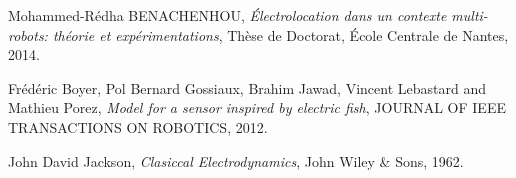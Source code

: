 \documentclass[11pt,a4paper,french]{article}
\begin{document}
\begin{thebibliography}{99}
 Mohammed-Rédha BENACHENHOU, \emph{Électrolocation dans un contexte multi-robots: théorie et expérimentations}, Thèse de Doctorat, École Centrale de Nantes, 2014. 

 Frédéric Boyer, Pol Bernard Gossiaux, Brahim Jawad, Vincent Lebastard and Mathieu Porez, \emph{Model for a sensor inspired by electric fish}, JOURNAL OF IEEE TRANSACTIONS ON ROBOTICS, 2012.

 John David Jackson, \emph{Clasiccal Electrodynamics}, John Wiley \& Sons, 1962.
\end{thebibliography}
\IMTAcoverpage
\end{document}
